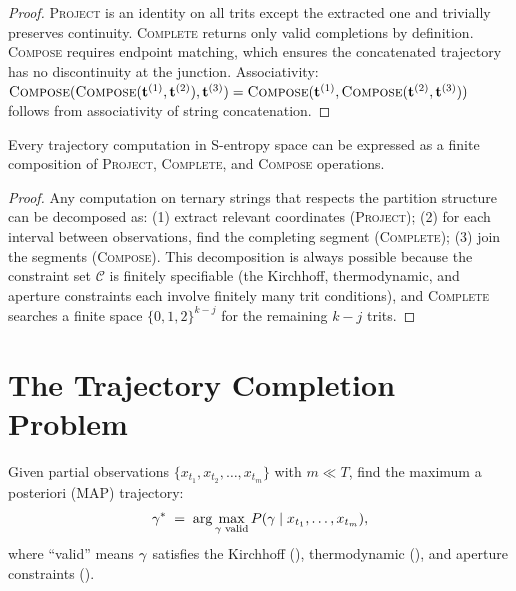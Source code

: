 \begin{proof}
\textsc{Project} is an identity on all trits except the extracted one and
trivially preserves continuity.  \textsc{Complete} returns only valid
completions by definition.  \textsc{Compose} requires endpoint matching,
which ensures the concatenated trajectory has no discontinuity at the
junction.  Associativity: $\textsc{Compose}(\textsc{Compose}(\mathbf{t}^{(1)},
\mathbf{t}^{(2)}), \mathbf{t}^{(3)}) = \textsc{Compose}(\mathbf{t}^{(1)},
\textsc{Compose}(\mathbf{t}^{(2)}, \mathbf{t}^{(3)}))$ follows from
associativity of string concatenation.
\end{proof}

\begin{theorem}
\label{thm:sufficiency}
Every trajectory computation in S-entropy space can be expressed as a
finite composition of \textsc{Project}, \textsc{Complete}, and \textsc{Compose}
operations.
\end{theorem}

\begin{proof}
Any computation on ternary strings that respects the partition structure can
be decomposed as: (1) extract relevant coordinates (\textsc{Project}); (2) for
each interval between observations, find the completing segment
(\textsc{Complete}); (3) join the segments (\textsc{Compose}).  This
decomposition is always possible because the constraint set $\mathcal{C}$ is
finitely specifiable (the Kirchhoff, thermodynamic, and aperture constraints
each involve finitely many trit conditions), and \textsc{Complete} searches a
finite space $\{0,1,2\}^{k-j}$ for the remaining $k-j$ trits.
\end{proof}

\section{The Trajectory Completion Problem}
\label{sec:completion-problem}

\begin{definition}
\label{def:completion}
Given partial observations $\{x_{t_1}, x_{t_2}, \ldots, x_{t_m}\}$ with
$m \ll T$, find the maximum a posteriori (MAP) trajectory:
\begin{equation}
    \gamma^* \;=\; \arg\max_{\gamma \text{ valid}} P(\gamma \mid x_{t_1},\ldots,x_{t_m}),
    \label{eq:map-traj}
\end{equation}
where ``valid'' means $\gamma$ satisfies the Kirchhoff (),
thermodynamic (), and aperture constraints
().
\end{definition}

